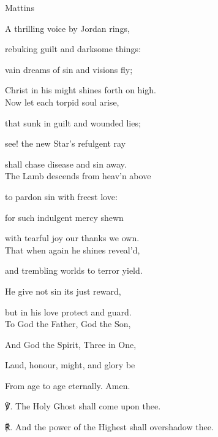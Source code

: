 \begin{paracol}{2}[]
\switchcolumn

\begin{inhead}
	Mattins
\end{inhead}

\begin{hangparas}{1.25em}{1}

A thrilling voice by Jordan rings,

rebuking guilt and darksome things:

vain dreams of sin and visions fly;

Christ in his might shines forth on high.\\

Now let each torpid soul arise,

that sunk in guilt and wounded lies;

see! the new Star's refulgent ray

shall chase disease and sin away.\\

The Lamb descends from heav'n above

to pardon sin with freest love:

for such indulgent mercy shewn

with tearful joy our thanks we own.\\

That when again he shines reveal'd,

and trembling worlds to terror yield.

He give not sin its just reward,

but in his love protect and guard.\\

To God the Father, God the Son,

And God the Spirit, Three in One,

Laud, honour, might, and glory be

From age to age eternally. Amen.\\
\end{hangparas}

℣. The Holy Ghost shall come upon thee.

℟. And the power of the Highest shall overshadow thee.\\

\par

\fussy
\end{paracol}

